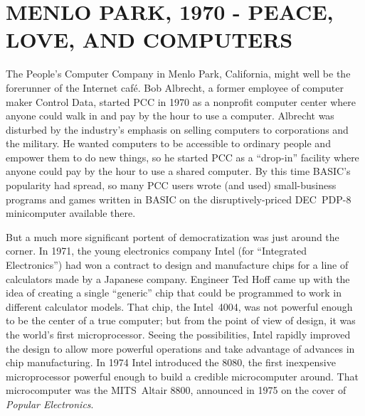 
\section{MENLO PARK, 1970 - PEACE, LOVE, AND COMPUTERS}



The People's Computer Company in Menlo Park, California, 
might well be the forerunner of the Internet caf\'{e}.
Bob Albrecht, a former employee of computer maker Control Data, started PCC
in 1970
as a nonprofit computer center where anyone could walk in and pay
by the hour to use a computer.
Albrecht was disturbed by
the industry's emphasis on selling computers to corporations and
the military.
He wanted computers to be accessible to ordinary people and empower
them to do new things, so he started PCC as a ``drop-in'' facility
where anyone could pay by the hour to use a shared computer.
By this time BASIC's popularity had spread, so many PCC users wrote
(and used) small-business programs and games written in BASIC on the
disruptively-priced DEC~PDP-8 minicomputer available there.


But a much more significant portent of democratization was just around
the corner.
In 1971, the young electronics company Intel (for ``Integrated
Electronics'') had won a contract to design and manufacture chips for
a line of calculators made by a Japanese company.
Engineer Ted Hoff came up with the idea of creating a single
``generic'' chip that could be programmed to work in different
calculator models.
That chip, the Intel~4004, was not powerful enough to be the center of
a true computer; but from the point of view of design, it was the
world's first microprocessor.
Seeing the possibilities, Intel rapidly improved the design to allow
more powerful operations and take advantage of advances in chip
manufacturing.
In 1974 Intel introduced the 8080, the first inexpensive
microprocessor powerful enough to build a credible microcomputer
around.
That microcomputer was the MITS~Altair 8800, announced in 1975 on the
cover of \emph{Popular Electronics}.

